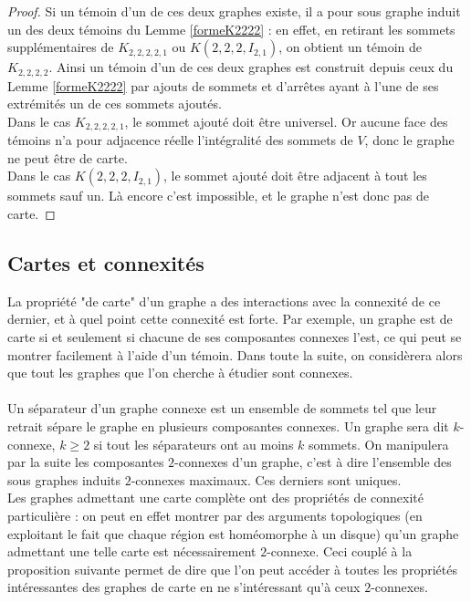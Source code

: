 \documentclass{scrartcl}
\begin{document}
\begin{flushleft}
\begin{proof}
    Si un témoin d'un de ces deux graphes existe, il a pour sous graphe induit un des deux témoins du Lemme \ref{formeK2222} :
    en effet, en retirant les sommets supplémentaires de $K_{2,2,2,2,1}$ ou $K(2,2,2,I_{2,1})$, on obtient un témoin de
    $K_{2,2,2,2}$. Ainsi un témoin d'un de ces deux graphes est construit depuis ceux du Lemme \ref{formeK2222} par ajouts
    de sommets et d'arrêtes ayant à l'une de ses extrémités un de ces sommets ajoutés.\\
    Dans le cas $K_{2,2,2,2,1}$, le sommet ajouté doit être universel. Or aucune face des témoins n'a pour adjacence réelle
    l'intégralité des sommets de $V$, donc le graphe ne peut être de carte.\\
    Dans le cas $K(2,2,2,I_{2,1})$, le sommet ajouté doit être adjacent à tout les sommets sauf un. Là encore c'est impossible, et le
    graphe n'est donc pas de carte.
\end{proof}


\subsection{Cartes et connexités}\label{cartesetconnex}

La propriété "de carte" d'un graphe a des interactions avec la connexité de ce dernier, et à quel point cette connexité
est forte. Par exemple, un graphe est de carte si et seulement si chacune de ses composantes connexes l'est, ce qui peut se montrer
facilement à l'aide d'un témoin. Dans toute la suite, on considèrera alors que tout les graphes que l'on cherche à étudier sont connexes.
\\~\\
Un séparateur d'un graphe connexe est un ensemble de sommets tel que leur retrait sépare le graphe en plusieurs composantes connexes.
Un graphe sera dit $k$-connexe, $k \geq 2$ si tout les séparateurs ont au moins $k$ sommets. On manipulera par la suite
les composantes $2$-connexes d'un graphe, c'est à dire l'ensemble des sous graphes induits $2$-connexes maximaux. Ces derniers
sont uniques.\\
Les graphes admettant une carte complète ont des propriétés de connexité particulière : on peut en effet montrer par des arguments
topologiques (en exploitant le fait que chaque région est homéomorphe à un disque) qu'un graphe admettant une telle carte
est nécessairement $2$-connexe. Ceci couplé à la proposition suivante permet de dire que l'on peut accéder à toutes les propriétés
intéressantes des graphes de carte en ne s'intéressant qu'à ceux $2$-connexes.


\end{flushleft}
\end{document}
